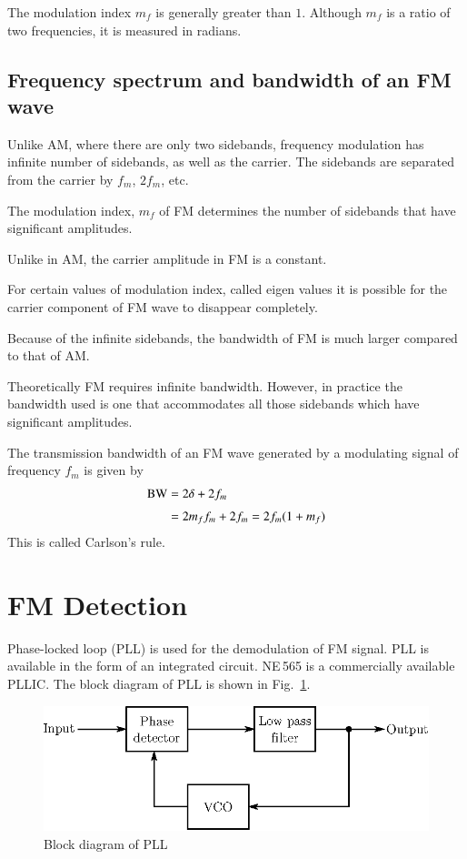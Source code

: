 The modulation index $m_{f}$ is generally greater than $1$. Although $m_{f}$ is a ratio of two frequencies, it is measured in radians.

\subsection{Frequency spectrum and bandwidth of an FM wave}\label{sec9.18.6}

Unlike AM, where there are only two sidebands, frequency modulation has infinite number of sidebands, as well as the carrier. The sidebands are separated from the carrier by $f_{m}$, $2f_{m}$, etc.

The modulation index, $m_{f}$ of FM determines the number of sidebands that have significant amplitudes.

Unlike in AM, the carrier amplitude in FM is a constant.

For certain values of modulation index, called eigen values it is possible for the carrier component of FM wave to disappear completely.

Because of the infinite sidebands, the bandwidth of FM is much larger compared to that of AM.

Theoretically FM requires infinite bandwidth. However, in practice the bandwidth used is one that accommodates all those sidebands which have significant amplitudes.

The transmission bandwidth of an FM wave generated by a modulating signal of frequency $f_{m}$ is given by
\begin{align}
\text{BW} &= 2\delta + 2f_{m}\notag\\[3pt]
&= 2m_{f}f_{m}+2f_{m}=2f_{m}(1+m_{f})\label{eq9.66}
\end{align}
This is called Carlson's rule.

\section{FM Detection}\label{sec9.19}

Phase-locked loop (PLL) is used for the demodulation of FM signal. PLL is available in the form of an integrated circuit. NE\,565 is a commercially available PLL\;IC. The block diagram of PLL is shown in Fig.~\ref{fig9.9}.
\begin{figure}[H]
\centering
\includegraphics{chap9/fig8.9.eps}
\caption{Block diagram of PLL}\label{fig9.9}
\end{figure}

